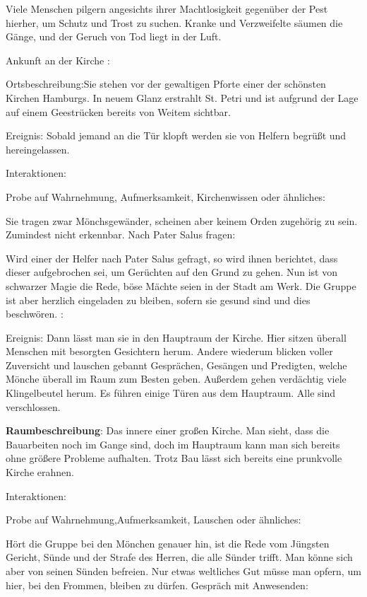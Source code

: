 Viele Menschen pilgern angesichts ihrer Machtlosigkeit gegenüber der Pest hierher, um Schutz und Trost zu suchen. Kranke und Verzweifelte säumen die Gänge, und der Geruch von Tod liegt in der Luft.


Ankunft an der Kirche
:

Ortsbeschreibung:Sie stehen vor der gewaltigen Pforte einer der schönsten Kirchen Hamburgs. In neuem Glanz erstrahlt St. Petri und ist aufgrund der Lage auf einem Geestrücken bereits von Weitem sichtbar.

Ereignis: Sobald jemand an die Tür klopft werden sie von Helfern begrüßt und hereingelassen.

Interaktionen:

Probe auf Wahrnehmung, Aufmerksamkeit, Kirchenwissen oder ähnliches:

Sie tragen zwar Mönchsgewänder, scheinen aber keinem Orden zugehörig zu sein.
Zumindest nicht erkennbar.
Nach Pater Salus fragen:

Wird einer der Helfer nach Pater Salus gefragt, so wird ihnen berichtet, dass dieser aufgebrochen sei, um Gerüchten auf den Grund zu gehen.
Nun ist von schwarzer Magie die Rede, böse Mächte seien in der Stadt am Werk. Die Gruppe ist aber herzlich eingeladen zu bleiben, sofern sie gesund sind und dies beschwören.
:

Ereignis: Dann lässt man sie in den Hauptraum der Kirche. Hier sitzen überall Menschen mit besorgten Gesichtern herum. Andere wiederum blicken voller Zuversicht und lauschen gebannt Gesprächen, Gesängen und Predigten, welche Mönche überall im Raum zum Besten geben. Außerdem gehen verdächtig viele Klingelbeutel herum. Es führen einige Türen aus dem Hauptraum. Alle sind verschlossen.

\textbf{Raumbeschreibung}: Das innere einer großen Kirche. Man sieht, dass die Bauarbeiten noch im Gange sind, doch im Hauptraum kann man sich bereits ohne größere Probleme aufhalten. Trotz Bau lässt sich bereits eine prunkvolle Kirche erahnen.

Interaktionen:

Probe auf Wahrnehmung,Aufmerksamkeit, Lauschen oder ähnliches:

Hört die Gruppe bei den Mönchen genauer hin, ist die Rede vom Jüngsten Gericht,
Sünde und der Strafe des Herren, die alle Sünder trifft.
Man könne sich aber von seinen Sünden befreien.
Nur etwas weltliches Gut müsse man opfern, um hier,
bei den Frommen, bleiben zu dürfen.
Gespräch mit Anwesenden:

